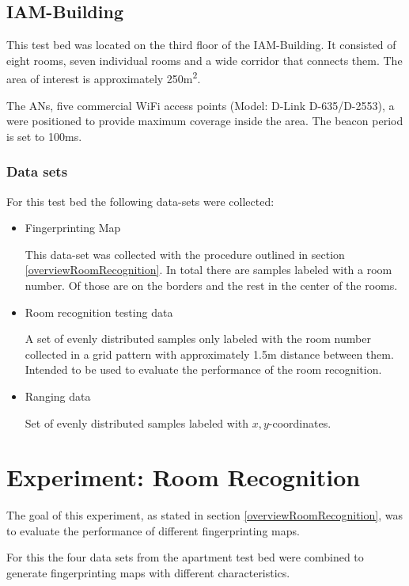 \subsection{IAM-Building}
This test bed was located on the third floor of the IAM-Building. It consisted of eight rooms, seven individual rooms and a wide corridor that connects them. The area of interest is approximately 250m\textsuperscript{2}.

The ANs, five commercial WiFi access points (Model: D-Link D-635/D-2553), a were positioned to provide maximum coverage inside the area. The beacon period is set to 100ms.



\subsubsection{Data sets}
For this test bed the following data-sets were collected:
\begin{itemize}
\item Fingerprinting Map

This data-set was collected with the procedure outlined in section \ref{overviewRoomRecognition}. In total there are  samples labeled with a room number. Of those  are on the borders and the rest in the center of the rooms. 
\item Room recognition testing data

A set of evenly distributed samples only labeled with the room number collected in a grid pattern with approximately 1.5m distance between them. Intended to be used to evaluate the performance of the room recognition.

\item Ranging data

Set of  evenly distributed samples labeled with \(x,y\)-coordinates. 
\end{itemize}

\section{Experiment: Room Recognition}
The goal of this experiment, as stated in section \ref{overviewRoomRecognition}, was to evaluate the performance of different fingerprinting maps.

For this the four data sets from the apartment test bed were combined to generate fingerprinting maps with different characteristics. 

